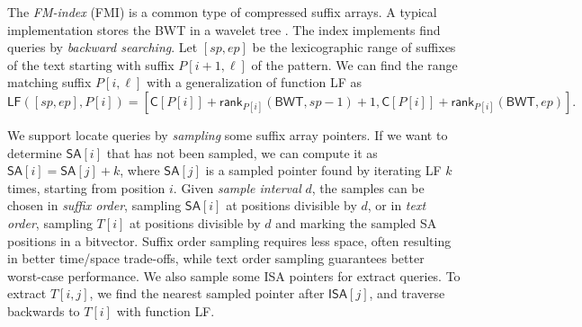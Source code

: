 \documentclass[a4paper,11pt]{llncs}
\newcommand{\SA}{\textsf{SA}}
\newcommand{\ISA}{\textsf{ISA}}
\newcommand{\BWT}{\textsf{BWT}}
\newcommand{\FMI}{\textsf{FMI}}
\newcommand{\mSA}{\ensuremath{\mathsf{SA}}}
\newcommand{\mISA}{\ensuremath{\mathsf{ISA}}}
\newcommand{\mBWT}{\ensuremath{\mathsf{BWT}}}
\newcommand{\mC}{\ensuremath{\mathsf{C}}}
\newcommand{\LF}{\textsf{LF}}
\newcommand{\find}{\textsf{find}}
\newcommand{\locate}{\textsf{locate}}
\newcommand{\extract}{\textsf{extract}}
\newcommand{\mLF}{\ensuremath{\mathsf{LF}}}
\newcommand{\mrank}{\ensuremath{\mathsf{rank}}}
\begin{document}
The \emph{FM-index} (\FMI) \cite{Ferragina2005a} is a common type of compressed suffix arrays. A typical implementation stores the \BWT{} in a wavelet tree \cite{Grossi2003}. The index implements \find{} queries by \emph{backward searching}. Let $[sp,ep]$ be the lexicographic range of suffixes of the text starting with suffix $P[i+1,\ell]$ of the pattern. We can find the range matching suffix $P[i,\ell]$ with a generalization of function \LF{} as
$$
\mLF([sp,ep],P[i]) =
[\mC[P[i]] + \mrank_{P[i]}(\mBWT, sp-1) + 1,
\mC[P[i]] + \mrank_{P[i]}(\mBWT, ep)].
$$

We support \locate{} queries by \emph{sampling} some suffix array pointers. If we want to determine $\mSA[i]$ that has not been sampled, we can compute it as $\mSA[i] = \mSA[j]+k$, where $\mSA[j]$ is a sampled pointer found by iterating \LF{} $k$ times, starting from position $i$. Given \emph{sample interval} $d$, the samples can be chosen in \emph{suffix order}, sampling $\mSA[i]$ at positions divisible by $d$, or in \emph{text order}, sampling $T[i]$ at positions divisible by $d$ and marking the sampled \SA{} positions in a bitvector. Suffix order sampling requires less space, often resulting in better time/space trade-offs, while text order sampling guarantees better worst-case performance. We also sample some \ISA{} pointers for \extract{} queries. To extract $T[i,j]$, we find the nearest sampled pointer after $\mISA[j]$, and traverse backwards to $T[i]$ with function \LF.
\end{document}
